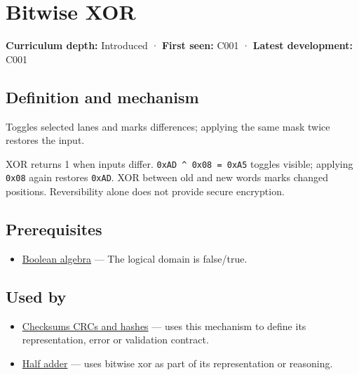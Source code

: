\hypertarget{appendix-d49161831368}{}\label{referencestart:appendix-d49161831368}
\section{Bitwise XOR}\label{appendix-d49161831368-bitwise-xor}

\textbf{Curriculum depth:} Introduced · \textbf{First seen:} C001 · \textbf{Latest development:} C001

\begin{allmightroledefinition}

\subsection{Definition and mechanism}\label{appendix-d49161831368-definition-and-mechanism}

Toggles selected lanes and marks differences; applying the same mask twice restores the input.

\end{allmightroledefinition}

XOR returns 1 when inputs differ. \texttt{0xAD\ \^{}\ 0x08\ =\ 0xA5} toggles visible; applying \texttt{0x08} again restores \texttt{0xAD}. XOR between old and new words marks changed positions. Reversibility alone does not provide secure encryption.

\subsection{Prerequisites}\label{appendix-d49161831368-prerequisites}

\begin{itemize}
\tightlist
\item
  \hyperref[appendix-24475e1596a8]{Boolean algebra} --- The logical domain is false/true.
\end{itemize}

\subsection{Used by}\label{appendix-d49161831368-used-by}

\begin{itemize}
\item
  \hyperref[appendix-ed338677de0a]{Checksums CRCs and hashes} --- uses this mechanism to define its representation, error or validation contract.
\item
  \hyperref[appendix-1652d27a8e90]{Half adder} --- uses bitwise xor as part of its representation or reasoning.
\end{itemize}

